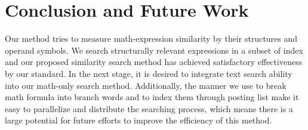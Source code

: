 \documentclass{acm_proc_article-sp}
\begin{document}
\section{Conclusion and Future Work}
Our method tries to measure math-expression similarity by their structures and operand symbols. 
We search structurally relevant expressions in a subset of index and our proposed similarity search method has achieved satisfactory effectiveness by our standard.
In the next stage, it is desired to integrate text search ability into our math-only search method. 
Additionally, the manner we use to break math formula into branch words and to index them through posting list make it easy to parallelize and distribute the searching process,
which means there is a large potential for future efforts to improve the efficiency of this method.


\end{document}
